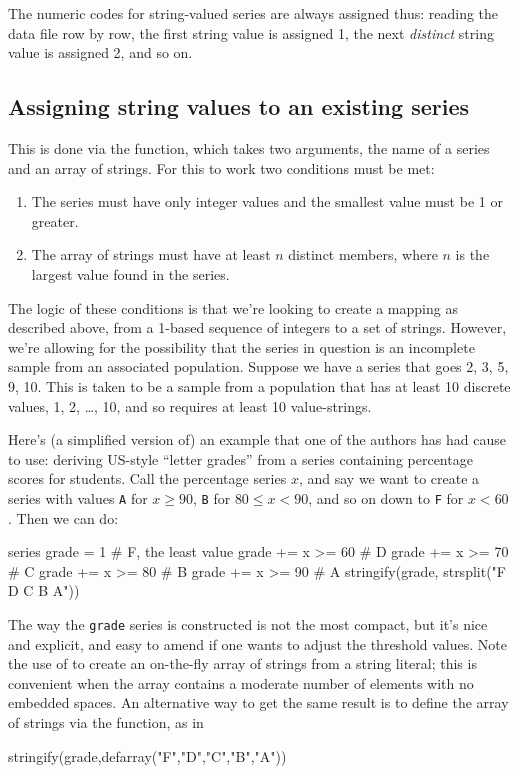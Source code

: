 The numeric codes for string-valued series are always assigned thus:
reading the data file row by row, the first string value is assigned
1, the next \textit{distinct} string value is assigned 2, and so on.

\subsection{Assigning string values to an existing series}
\label{sec:stringify}

This is done via the  function, which takes two
arguments, the name of a series and an array of strings. For this to
work two conditions must be met:

\begin{enumerate}
\item The series must have only integer values and the smallest value
  must be 1 or greater.
\item The array of strings must have at least $n$ distinct members,
  where $n$ is the largest value found in the series.
\end{enumerate}

The logic of these conditions is that we're looking to create a
mapping as described above, from a 1-based sequence of integers to a
set of strings. However, we're allowing for the possibility that the
series in question is an incomplete sample from an associated
population. Suppose we have a series that goes 2, 3, 5, 9, 10. This is
taken to be a sample from a population that has at least 10 discrete
values, 1, 2, \dots{}, 10, and so requires at least 10 value-strings.

Here's (a simplified version of) an example that one of the authors
has had cause to use: deriving US-style ``letter grades'' from a
series containing percentage scores for students. Call the percentage
series $x$, and say we want to create a series with values \texttt{A}
for $x \geq 90$, \texttt{B} for $80 \leq x <90$, and so on down to
\texttt{F} for $x<60$. Then we can do:
\begin{code}
series grade = 1 # F, the least value
grade += x >= 60 # D
grade += x >= 70 # C
grade += x >= 80 # B
grade += x >= 90 # A
stringify(grade, strsplit("F D C B A"))
\end{code}
%
The way the \texttt{grade} series is constructed is not the most
compact, but it's nice and explicit, and easy to amend if one wants to
adjust the threshold values. Note the use of  to
create an on-the-fly array of strings from a string literal; this is
convenient when the array contains a moderate number of elements with
no embedded spaces. An alternative way to get the same result is to
define the array of strings via the  function, as in
\begin{code}
stringify(grade,defarray("F","D","C","B","A"))
\end{code}


